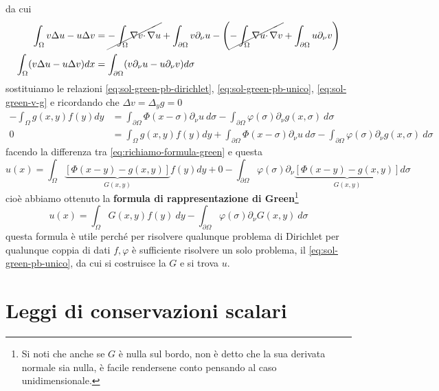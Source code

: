 \documentclass[10pt,a4paper,twoside,openright]{book}
\begin{document}
da cui
\begin{align*}
	\int _{\Omega } v\Delta u-u\Delta v      & =\cancel{-\int _{\Omega } \nabla v\cdotp \nabla u} +\int _{\partial \Omega } v\partial _{\nu } u-\left(\cancel{-\int _{\Omega } \nabla u\cdotp \nabla v} +\int _{\partial \Omega } u\partial _{\nu } v\right) \\
	\int _{\Omega }( v\Delta u-u\Delta v) dx & =\int _{\partial \Omega }( v\partial _{\nu } u-u\partial _{\nu } v) d\sigma                                                                                                                                 
\end{align*}
sostituiamo le relazioni \eqref{eq:sol-green-pb-dirichlet}, \eqref{eq:sol-green-pb-unico}, \eqref{eq:sol-green-v-g} e ricordando che $\Delta v=\Delta _{y} g=0$
\begin{align*}
	-\int _{\Omega } g( x,y) f( y) dy & =\int _{\partial \Omega } \Phi ( x-\sigma ) \partial _{\nu } u\ d\sigma -\int _{\partial \Omega } \varphi ( \sigma ) \partial _{\nu } g( x,\sigma ) \ d\sigma                                  \\
	0                                 & =\int _{\Omega } g( x,y) f( y) dy+\int _{\partial \Omega } \Phi ( x-\sigma ) \partial _{\nu } u\ d\sigma -\int _{\partial \Omega } \varphi ( \sigma ) \partial _{\nu } g( x,\sigma ) \ d\sigma 
\end{align*}
facendo la differenza tra \eqref{eq:richiamo-formula-green} e questa
\begin{equation*}
	u( x) =\int _{\Omega }\underbrace{[ \Phi ( x-y) -g( x,y)]}_{G( x,y)} f( y) dy+0-\int _{\partial \Omega } \varphi ( \sigma ) \partial _{\nu }\underbrace{[ \Phi ( x-y) -g( x,y)]}_{G( x,y)} d\sigma 
\end{equation*}
cioè abbiamo ottenuto la \textbf{formula di rappresentazione di Green}\footnote{Si noti che anche se $G$ è nulla sul bordo, non è detto che la sua derivata normale sia nulla, è facile rendersene conto pensando al caso unidimensionale.}
\begin{equation*}
	\boxed{u( x) =\int _{\Omega } G( x,y) f( y) \ dy-\int _{\partial \Omega } \varphi ( \sigma ) \partial _{\nu } G( x,y) \ d\sigma }
\end{equation*}
questa formula è utile perché per risolvere qualunque problema di Dirichlet per qualunque coppia di dati $f,\varphi $ è sufficiente risolvere un solo problema, il \eqref{eq:sol-green-pb-unico}, da cui si costruisce la $G$ e si trova $u$.
\chapter{Leggi di conservazioni scalari}
\end{document}
